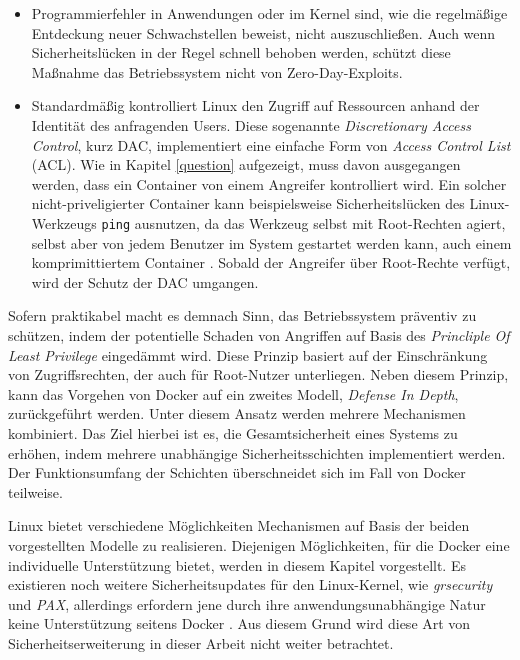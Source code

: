 \documentclass[../main.tex]{subfiles}
\begin{document}
		\begin{itemize}
			\item	Programmierfehler in Anwendungen oder im Kernel sind, wie die regelmäßige Entdeckung neuer Schwachstellen beweist, nicht auszuschließen. Auch wenn Sicherheitslücken in der Regel schnell behoben werden, schützt diese Maßnahme das Betriebssystem nicht von Zero-Day-Exploits.
			\item	Standardmäßig kontrolliert Linux den Zugriff auf Ressourcen anhand der Identität des anfragenden Users. Diese sogenannte \emph{Discretionary Access Control}, kurz \acrshort{DAC}, implementiert eine einfache Form von \emph{Access Control List} (\acrshort{ACL}). Wie in Kapitel \ref{question} aufgezeigt, muss davon ausgegangen werden, dass ein Container von einem Angreifer kontrolliert wird. Ein solcher nicht-priveligierter Container kann beispielsweise Sicherheitslücken des Linux-Werkzeugs \texttt{ping} ausnutzen, da das Werkzeug selbst mit Root-Rechten agiert, selbst aber von jedem Benutzer im System gestartet werden kann, auch einem komprimittiertem Container \cite[S.26]{SELinuxApparmor}. Sobald der Angreifer über Root-Rechte verfügt, wird der Schutz der \acrshort{DAC} umgangen.
		\end{itemize}

		Sofern praktikabel macht es demnach Sinn, das Betriebssystem präventiv zu schützen, indem der potentielle Schaden von Angriffen auf Basis des \emph{Princliple Of Least Privilege} eingedämmt wird. Diese Prinzip basiert auf der Einschränkung von Zugriffsrechten, der auch für Root-Nutzer unterliegen. Neben diesem Prinzip, kann das Vorgehen von Docker auf ein zweites Modell, \emph{Defense In Depth}, zurückgeführt werden. Unter diesem Ansatz werden mehrere Mechanismen kombiniert. Das Ziel hierbei ist es, die Gesamtsicherheit eines Systems zu erhöhen, indem mehrere unabhängige Sicherheitsschichten implementiert werden. Der Funktionsumfang der Schichten überschneidet sich im Fall von Docker teilweise.

		Linux bietet verschiedene Möglichkeiten Mechanismen auf Basis der beiden vorgestellten Modelle zu realisieren. Diejenigen Möglichkeiten, für die Docker eine individuelle Unterstützung bietet, werden in diesem Kapitel vorgestellt. Es existieren noch weitere Sicherheitsupdates für den Linux-Kernel, wie \emph{grsecurity} und \emph{PAX}, allerdings erfordern jene durch ihre anwendungsunabhängige Natur keine Unterstützung seitens Docker \cite{dockerSecurity}. Aus diesem Grund wird diese Art von Sicherheitserweiterung in dieser Arbeit nicht weiter betrachtet.
\end{document}
